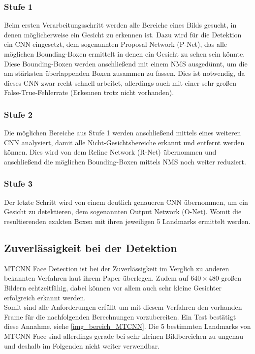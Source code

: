 \subsubsection{Stufe 1}
Beim ersten Verarbeitungsschritt werden alle Bereiche eines Bilds gesucht, in denen möglicherweise ein Gesicht zu erkennen ist. Dazu wird für die Detektion ein CNN eingesetzt, dem sogenannten Proposal Network (P-Net), das alle möglichen Bounding-Boxen ermittelt in denen ein Gesicht zu sehen sein könnte. Diese Bounding-Boxen werden anschließend mit einem NMS ausgedünnt, um die am stärksten überlappenden Boxen zusammen zu fassen. Dies ist notwendig, da dieses CNN zwar recht schnell arbeitet, allerdings auch mit einer sehr großen False-True-Fehlerrate (Erkennen trotz nicht vorhanden).
\subsubsection{Stufe 2}
Die möglichen Bereiche aus Stufe 1 werden anschließend mittels eines weiteren CNN analysiert, damit alle Nicht-Gesichtsbereiche erkannt und entfernt werden können. Dies wird von dem Refine Network (R-Net) übernommen und anschließend die möglichen Bounding-Boxen mittels NMS noch weiter reduziert.
\subsubsection{Stufe 3}
Der letzte Schritt wird von einem deutlich genaueren CNN übernommen, um ein Gesicht zu detektieren, dem sogenannten Output Network (O-Net). Womit die resultierenden exakten Boxen mit ihren jeweiligen 5 Landmarks ermittelt werden.
\subsection{Zuverlässigkeit bei der Detektion}
MTCNN Face Detection ist bei der Zuverlässigkeit im Verglich zu anderen bekannten Verfahren laut ihrem Paper \cite{MTCCN} überlegen. Zudem auf $640\times 480$ großen Bildern echtzeitfähig, dabei können vor allem auch sehr kleine Gesichter erfolgreich erkannt werden.\\
Somit sind alle Anforderungen erfüllt um mit diesem Verfahren den vorhanden Frame für die nachfolgenden Berechnungen vorzubereiten. Ein Test bestätigt diese Annahme, siehe \autoref{img_bereich_MTCNN}.
Die 5 bestimmten Landmarks von MTCNN-Face sind allerdings gerade bei sehr kleinen Bildbereichen zu ungenau und deshalb im Folgenden nicht weiter verwendbar.
